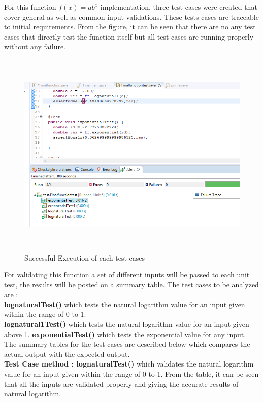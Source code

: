 \documentclass[12pt]{report}
\begin{document}
{For this function $f(x)=ab^x$ implementation, three test cases were created that cover general as well as common input validations. These tests cases are traceable to initial requirements.
From the figure, it can be seen that there are no any test cases that directly test the function itself but all test cases are running properly without any failure.\newline
\begin{figure}[h!]
    \includegraphics[width=16cm, height=10cm]{Image/testReview1.png}
    \caption{Successful Execution of each test cases}
\end{figure}
\newline
For validating this function a set of different inputs will be passed to each unit test, the results will be posted on a summary table.
\newline
\noindent The test cases to be analyzed are :\\
\textbf{lognaturalTest()} which tests the natural logarithm value for an input given within the range of 0 to 1.\\ 
\noindent\textbf{lognatural1Test()} which tests the natural logarithm value for an input given above 1. 
\textbf{exponentialTest()} which tests the exponential value for any input.
\newline
\newline
The summary tables for the test cases are described below which compares the actual output with the expected output.\\
\clearpage
\noindent
\textbf{Test Case method : lognaturalTest()} which validates the natural logarithm value for an input given within the range of 0 to 1. From the table, it can be seen that all the inputs are validated properly and giving the accurate results of natural logarithm.\\

}
\end{document}
